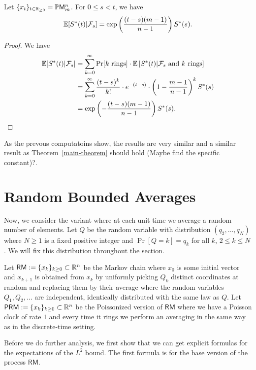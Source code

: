 \documentclass[12pt]{article}
\begin{document}
\begin{cor}
	Let $\{x_t\}_{t \in \mathbb{R}_{\geq 0}} = \mathbb{P} \mathsf{M}_m^n$. For $0 \leq s < t$, we have 
	\[
		\mathbb{E} [S^*(t) | \mathcal{F}_s] = \exp \left ( \frac{(t-s)(m-1)}{n-1} \right ) S^*(s).	
	\]
\end{cor}
\begin{proof}
	We have 
	\begin{align*}
		\mathbb{E} [ S^*(t) | \mathcal{F}_s ] & = \sum_{k = 0}^\infty \Pr[k \text{ rings}] \cdot \mathbb{E} \left [ S^*(t) | \mathcal{F}_s \text{ and } k \text{ rings} \right ] \\
		& = \sum_{k = 0}^\infty \frac{(t-s)^k}{k!} \cdot e^{-(t-s)} \cdot \left ( 1 - \frac{m-1}{n-1} \right )^k S^*(s) \\
		& = \exp \left ( -\frac{(t-s)(m-1)}{n-1} \right ) S^*(s). 
	\end{align*}
\end{proof}

As the prevous computatoins show, the results are very similar and a similar result as Theorem~\ref{main-theorem} should hold (Maybe find the specific constant)?.

\section{Random Bounded Averages}

Now, we consider the variant where at each unit time we average a random number of elements. Let $Q$ be the random variable with distribution $(q_2, \ldots, q_N)$ where $N \geq 1$ is a fixed positive integer and $\Pr[Q = k] = q_k$ for all $k$, $2 \leq k \leq N$. We will fix this distribution throughout the section. 

\begin{defn}
	Let $\mathsf{RM} := \{x_k\}_{k \geq 0} \subset \mathbb{R}^n$ be the Markov chain where $x_0$ is some initial vector and $x_{k+1}$ is obtained from $x_k$ by uniformly picking $Q_k$ distinct coordinates at random and replacing them by their average where the random variables $Q_1, Q_2, \ldots$ are independent, identically distributed with the same law as $Q$. Let $\mathsf{PRM} := \{x_k\}_{k \geq 0} \subset \mathbb{R}^n$ be the Poissonized version of $\mathsf{RM}$ where we have a Poisson clock of rate $1$ and every time it rings we perform an averaging in the same way as in the discrete-time setting. 
\end{defn} 

Before we do further analysis, we first show that we can get explicit formulas for the expectations of the $L^2$ bound. The first formula is for the base version of the process $\mathsf{RM}$.
\end{document}
